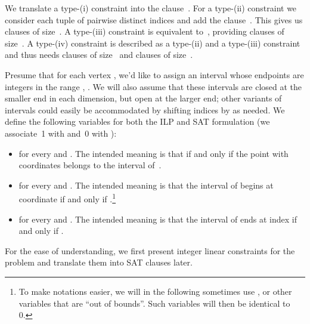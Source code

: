 \documentclass[runningheads]{llncs}
\newcounter{constr}
\begin{document}
We translate a type-(i) constraint
into the clause~.
For a type-(ii) constraint we consider each tuple of  pairwise
distinct indices  and
 add the clause~. 
This gives us  clauses of size~.
A \mbox{type-(iii)} constraint is equivalent to~,
providing  clauses of size~.
A type-(iv) constraint 
is described as a type-(ii) and a type-(iii) constraint and thus needs
 clauses of size~
and  clauses of size~. 





\iffalse

Presume that for each vertex , we'd like to assign an interval
whose endpoints are integers in the range 
, .
  We will also assume that these intervals are closed at the 
  smaller end in each dimension, but open at the larger end; other
variants of intervals could easily be accommodated by shifting
indices by  as needed.  We define the following variables
for both the ILP and SAT formulation (we associate~1 with  
and~0 with ):
\begin{itemize}
\item  for every  and 
.
	The intended meaning is that  if and only if the point
	with coordinates 
	 belongs to the interval of~.  
\item  for every  
	and .
	The intended meaning is that the interval of  begins at
	coordinate  if and only if .\footnote{To make notations easier, we will in the following sometimes
use , or other variables that are ``out of bounds''.  Such
variables will then be identical to 0.}
\item  for every  
	and .
	The intended meaning is that the interval of  ends at
	index  if and only if .  
\end{itemize}
For the ease of understanding, we first present integer linear constraints
for the problem and translate them into SAT clauses later. 
\end{document}
